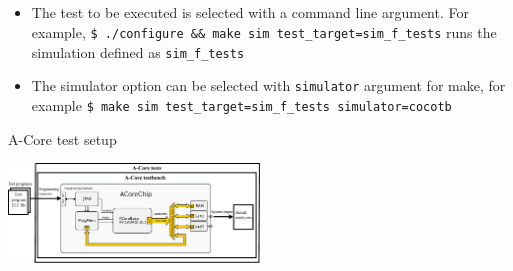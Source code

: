 \documentclass{sdkslides}
\begin{document}
\subsection*{\sectionname}
\begin{frame}[t,fragile]
    \frametitle{\sectionname}
    \begin{itemize}
        \item The test to be executed is selected with a command line
            argument. For example, \verb|$ ./configure && make sim test_target=sim_f_tests|
            runs the simulation defined as \verb|sim_f_tests|
        \item The simulator option can be selected with \verb|simulator| argument for make, 
            for example \verb|$ make sim test_target=sim_f_tests simulator=cocotb|
    \end{itemize}
    \begin{block}{A-Core test setup}
        \begin{center}
            \includegraphics[width=0.5\textwidth]{./Pics/A-Core_testsetup.eps}
        \end{center}
    \end{block}
\end{frame}


\renewcommand{\sectionname}{Layout preparation}
\end{document}
